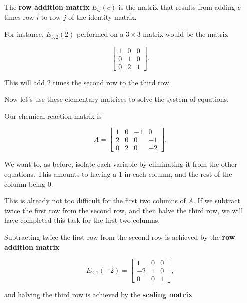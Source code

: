 \documentclass{ximera}
\begin{document}
\begin{exploration}
\begin{example}
\begin{remark}
  \begin{definition}
    The \textbf{row addition matrix} $E_{ij}(c)$ is the matrix that results from adding $c$ times row $i$ to row $j$ of the identity matrix.

    For instance, $E_{3,2}(2)$ performed on a $3\times 3$ matrix would be the matrix

    \begin{equation*}
      \begin{bmatrix}
        1 & 0 & 0 \\
        0 & 1 & 0 \\
        0 & 2 & 1
      \end{bmatrix}.
    \end{equation*}

    This will add $2$ times the second row to the third row.
  \end{definition}

\end{remark}

Now let's use these elementary matrices to solve the system of equations.

Our chemical reaction matrix is 

\begin{equation*}
  A = \begin{bmatrix}
    1 & 0 & -1 & 0 \\
    2 & 0 & 0 & -1 \\
    0 & 2 & 0 & -2
  \end{bmatrix}.
\end{equation*}

We want to, as before, isolate each variable by eliminating it from the other equations. This amounts to having a $1$ in each column, and the rest of the column being $0$.

This is already not too difficult for the first two columns of $A$. If we subtract twice the first row from the second row, and then halve the third row, we will have completed this task for the first two columns.

Subtracting twice the first row from the second row is achieved by the {\bf row addition matrix} 

$$E_{2,1}(-2)=\begin{bmatrix}1 & 0 & 0 \\ -2 & 1 & 0 \\ 0 & 0 & 1\end{bmatrix},$$

and halving the third row is achieved by the {\bf scaling matrix}


\end{example}
\end{exploration}
\end{document}
